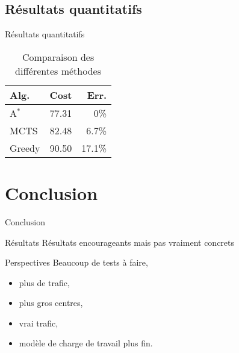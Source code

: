 \documentclass[tikz]{beamer}
\begin{document}
\subsection{Résultats quantitatifs}
\begin{frame}[c]{Résultats quantitatifs}
\begin{table}
  \centering
  \begin{tabulary}
    {\textwidth}{LRR}
    Alg.    & Cost  & Err.   \\
    \toprule
    A\(^*\) & 77.31 & 0\%    \\
    MCTS    & 82.48 & 6.7\%  \\
    Greedy  & 90.50 & 17.1\% \\
  \end{tabulary}
  \caption{Comparaison des différentes méthodes}\label{tab:methods_compare}
\end{table}
\end{frame}
\section*{Conclusion}
\begin{frame}[c]{Conclusion}
  \begin{block}{Résultats}
    Résultats encourageants mais pas vraiment concrets
  \end{block}
  \begin{block}{Perspectives}
    Beaucoup de tests à faire,
    \begin{itemize}
      \item plus de trafic,
      \item plus gros centres,
      \item vrai trafic,
      \item modèle de charge de travail plus fin.
    \end{itemize}
  \end{block}
\end{frame}
\end{document}
